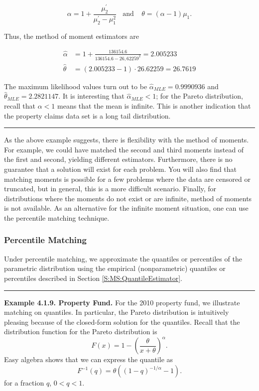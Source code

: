 \documentclass[]{book}
\theoremstyle{definition}
\theoremstyle{definition}
\theoremstyle{definition}
\theoremstyle{remark}
\begin{document}
\[\alpha = 1+ \frac{\mu_2^{\prime}}{\mu_2^{\prime}-\mu_1^2} \ \ \ \
\text{and} \ \ \ \ \
 \theta = (\alpha-1)\mu_1.\]

Thus, the method of moment estimators are

\[\begin{aligned}
\hat{\alpha} &=  1+ \frac{136154.6}{136154.6-26,62259^2} = 2.005233 \\
\hat{\theta} &=  (2.005233-1) \cdot 26.62259 = 26.7619
\end{aligned}\]

The maximum likelihood values turn out to be
\(\hat{\alpha}_{MLE} = 0.9990936\) and
\(\hat{\theta}_{MLE} = 2.2821147\). It is interesting that
\(\hat{\alpha}_{MLE}<1\); for the Pareto distribution, recall that
\(\alpha <1\) means that the mean is infinite. This is another
indication that the property claims data set is a long tail
distribution.

\begin{center}\rule{0.5\linewidth}{\linethickness}\end{center}

As the above example suggests, there is flexibility with the method of
moments. For example, we could have matched the second and third moments
instead of the first and second, yielding different estimators.
Furthermore, there is no guarantee that a solution will exist for each
problem. You will also find that matching moments is possible for a few
problems where the data are censored or truncated, but in general, this
is a more difficult scenario. Finally, for distributions where the
moments do not exist or are infinite, method of moments is not
available. As an alternative for the infinite moment situation, one can
use the percentile matching technique.

\subsubsection{Percentile Matching}\label{percentile-matching}

Under percentile matching, we approximate the quantiles or percentiles
of the parametric distribution using the empirical (nonparametric)
quantiles or percentiles described in Section
\ref{S:MS:QuantileEstimator}.

\begin{center}\rule{0.5\linewidth}{\linethickness}\end{center}

\textbf{Example 4.1.9. Property Fund.} For the 2010 property fund, we
illustrate matching on quantiles. In particular, the Pareto distribution
is intuitively pleasing because of the closed-form solution for the
quantiles. Recall that the distribution function for the Pareto
distribution is
\[F(x) = 1 - \left(\frac{\theta}{x+\theta}\right)^{\alpha}.\] Easy
algebra shows that we can express the quantile as
\[F^{-1}(q) = \theta \left( (1-q)^{-1/\alpha} -1 \right).\] for a
fraction \(q\), \(0<q<1\).
\end{document}

